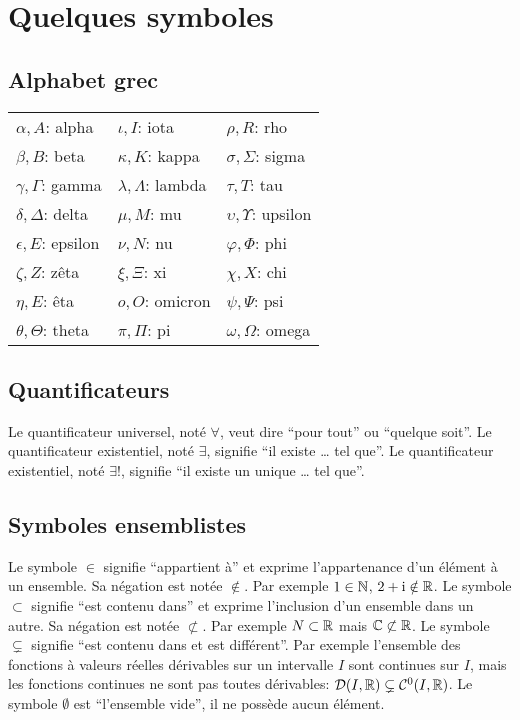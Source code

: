 \chapter{Quelques symboles}\label{chap:qqsymboles}

\section{Alphabet grec}

\begin{tabularx}{\textwidth}{XXX}
  \(\alpha, A \): alpha & \(\iota, I\): iota & \(\rho, R\): rho \\
  \(\beta, B\): beta & \(\kappa, K\): kappa & \(\sigma, \Sigma\): sigma \\
  \(\gamma, \Gamma\): gamma & \(\lambda, \Lambda\): lambda & \(\tau, T\): tau 
  \\
  \(\delta, \Delta\): delta & \(\mu, M\): mu & \(\upsilon, \Upsilon\): 
  upsilon \\
  \(\epsilon, E\): epsilon & \(\nu, N\): nu & \(\varphi, \Phi\): phi \\
  \(\zeta, Z\): zêta & \(\xi, \Xi\): xi & \(\chi, X\): chi \\
  \(\eta, E\): êta & \(o, O\): omicron & \(\psi, \Psi\): psi\\
  \(\theta, \Theta\): theta & \(\pi, \Pi\): pi & \(\omega, \Omega\): omega
\end{tabularx}

\section{Quantificateurs}

Le quantificateur universel, noté \(\forall\), veut dire ``pour tout'' ou 
``quelque soit''. Le quantificateur existentiel, noté \(\exists\), signifie ``il 
existe \ldots{} tel que''. Le quantificateur existentiel, noté \(\exists!\), 
signifie ``il existe un unique \ldots{} tel que''.

\section{Symboles ensemblistes}

Le symbole \(\in\) signifie ``appartient à'' et exprime l'appartenance d'un 
élément à un ensemble. Sa négation est notée \(\notin\). Par exemple \(1 \in 
\mathbb{N}\), \(2+\operatorname{i} \notin \mathbb{R}\). Le symbole \(\subset\) signifie ``est contenu dans'' 
et exprime l'inclusion d'un ensemble dans un autre. Sa négation est notée 
\(\not\subset\). Par exemple \(N \subset \mathbb{R}\) mais \(\mathbb{C} \not\subset \mathbb{R}\). Le 
symbole \(\subsetneq\) signifie ``est contenu dans et est différent''. Par 
exemple l'ensemble des fonctions à valeurs réelles dérivables sur un intervalle 
\(I\) sont continues sur \(I\), mais les fonctions continues ne sont pas toutes 
dérivables: \(\mathcal{D}(I,\mathbb{R}) \subsetneq \mathcal{C}^{0}(I,\mathbb{R})\). Le symbole \(\emptyset\) 
est ``l'ensemble vide'', il ne possède aucun élément.

